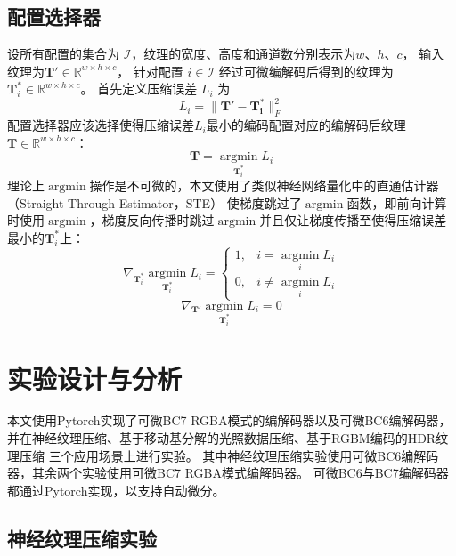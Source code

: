 \subsection{配置选择器}

设所有配置的集合为 $\mathcal{I}$，纹理的宽度、高度和通道数分别表示为$w$、$h$、$c$，
输入纹理为$\mathbf{T}'\in \mathbb{R}^{w\times h\times c}$，
针对配置 $i\in\mathcal{I}$ 经过可微编解码后得到的纹理为 $\mathbf{T}^*_i\in \mathbb{R}^{w\times h\times c}$。
首先定义压缩误差 $L_i$ 为
\begin{equation}
    L_i=\|\mathbf{T'}-\mathbf{T^*_i}\|_F^2
\end{equation}
配置选择器应该选择使得压缩误差$L_i$最小的编码配置对应的编解码后纹理$\mathbf{T}\in \mathbb{R}^{w\times h\times c}$：
\begin{equation}
    \mathbf{T}=\mathop{\arg\min}\limits_{\mathbf{T}^*_i} L_i
\end{equation}
理论上$\mathop{\arg\min}$操作是不可微的，本文使用了类似神经网络量化中的直通估计器（Straight Through Estimator，STE）\cite{bengio2013estimating}
使梯度跳过了$\mathop{\arg\min}$函数，即前向计算时使用$\mathop{\arg\min}$，梯度反向传播时跳过$\mathop{\arg\min}$并且仅让梯度传播至使得压缩误差最小的$\mathbf{T}^*_i$上：
\begin{equation}
    \nabla_{\mathbf{T}^*_i}{\mathop{\arg\min}\limits_{\mathbf{T}^*_i} L_i} =\left\{\begin{matrix}
        1,& i=\mathop{\arg\min}\limits_{i} L_i
        \\0,& i\ne \mathop{\arg\min}\limits_{i} L_i
        \end{matrix}\right.
\end{equation}
\begin{equation}
    \nabla_{\mathbf{T}'}{\mathop{\arg\min}\limits_{\mathbf{T}^*_i} L_i}=0
\end{equation}

\section{实验设计与分析}

本文使用Pytorch实现了可微BC7 RGBA模式的编解码器以及可微BC6编解码器，
并在神经纹理压缩、基于移动基分解的光照数据压缩、基于RGBM编码的HDR纹理压缩
三个应用场景上进行实验。
其中神经纹理压缩实验使用可微BC6编解码器，其余两个实验使用可微BC7 RGBA模式编解码器。
可微BC6与BC7编解码器都通过Pytorch实现，以支持自动微分。

\subsection{神经纹理压缩实验}

